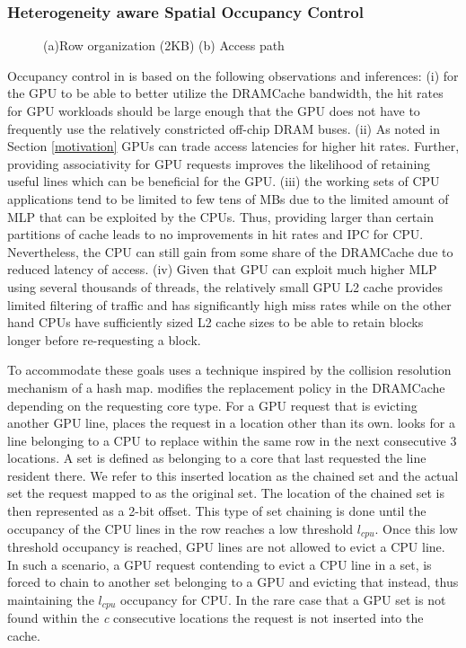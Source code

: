 \subsubsection{Heterogeneity aware Spatial Occupancy Control}
\begin{figure*}[!htb]
    \centering
    \chainaccess
    \caption{\cachename (a)Row organization (2KB) (b) Access path}
    \label{fig:chain-access}
\end{figure*}
Occupancy control in \cachename is based on the following observations and inferences: (i) for the GPU to be able to better utilize the DRAMCache bandwidth, the hit rates for GPU workloads should be large enough that the GPU does not have to frequently use the relatively constricted off-chip DRAM buses. (ii) As noted in Section \ref{motivation} GPUs can trade access latencies for higher hit rates. Further, providing associativity for GPU requests improves the likelihood of retaining useful lines which can be beneficial for the GPU. (iii) the working sets of CPU applications tend to be limited to few tens of MBs due to the limited amount of MLP that can be exploited by the CPUs. Thus, providing larger than certain partitions of cache leads to no improvements in hit rates and IPC for CPU. Nevertheless, the CPU can still gain from some share of the DRAMCache due to reduced latency of access. (iv) Given that GPU can exploit much higher MLP using several thousands of threads, the relatively small GPU L2 cache provides limited filtering of traffic and has significantly high miss rates while on the other hand CPUs have sufficiently sized L2 cache sizes to be able to retain blocks longer before re-requesting a block.
\par To accommodate these goals \cachename uses a technique inspired by the collision resolution mechanism of a hash map. \cachename modifies the replacement policy in the DRAMCache depending on the requesting core type. For a GPU request that is evicting another GPU line, \cachename places the request in a location other than its own. \cachename looks for a line belonging to a CPU to replace within the same row in the next consecutive 3 locations. A set is defined as belonging to a core that last requested the line resident there. We refer to this inserted location as the chained set and the actual set the request mapped to as the original set. The location of the chained set is then represented as a 2-bit offset. This type of set chaining is done until the occupancy of the CPU lines in the row reaches a low threshold \textit{$l_{cpu}$}. Once this low threshold occupancy is reached, GPU lines are not allowed to evict a CPU line. In such a scenario, a GPU request contending to evict a CPU line in a set, is forced to chain to another set belonging to a GPU and evicting that instead, thus maintaining the \textit{$l_{cpu}$} occupancy for CPU. In the rare case that a GPU set is not found within the \textit{c} consecutive locations the request is not inserted into the cache.


